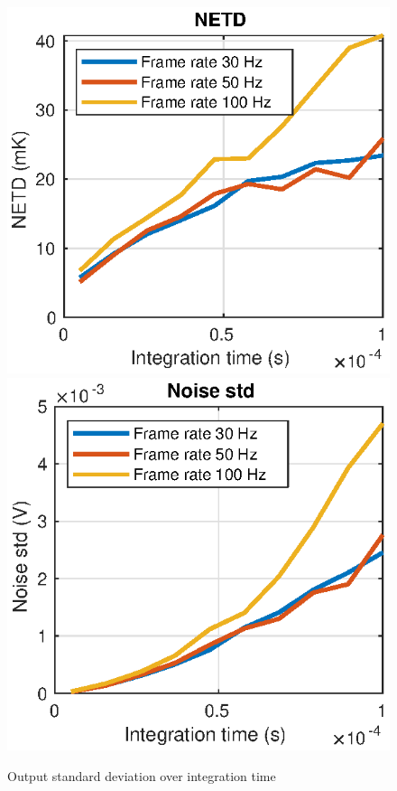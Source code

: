\begin{figure}[H]
 \begin{center}
\includegraphics[scale=0.8]{gfx/NETS_Function_of_Integration_Time.eps} 	 
\includegraphics[scale=0.8]{gfx/STD_Function_of_Integration_Time.eps} 	 
  \caption{Output standard deviation over integration time}
  \label{fig:std_over_time}
  \end{center}
\end{figure}


